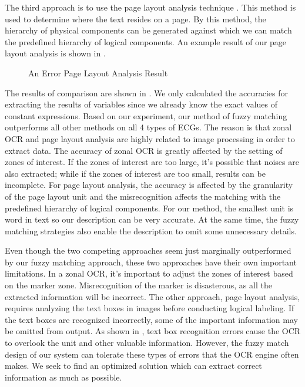 The third approach is to use the page layout analysis 
technique \cite{o1993document}. 
This method is used to determine where the text 
resides on a page. 
By this method, the hierarchy of physical components 
can be generated against which we can match the predefined 
hierarchy of logical components. An example result of our page layout 
analysis is shown in .

\begin{figure}[th]
\centering
{}
\caption{An Error Page Layout Analysis Result}
\label{fig:errorpl}
\end{figure}


The results of comparison are shown in . 
We only calculated the accuracies for extracting the results of 
variables since we already know the exact values of constant 
expressions. Based on our experiment, our method of fuzzy matching 
outperforms all other methods on all 4 types of ECGs. 
The reason is that zonal OCR and page layout analysis are highly 
related to image processing in order to extract data. The accuracy of 
zonal OCR is greatly affected by the setting of zones of interest. 
If the zones of interest are too large, it's possible that noises are
also extracted; while if the zones of interest are too small, results 
can be incomplete. For page layout analysis, the accuracy is 
affected by the granularity of the page layout unit and the 
misrecognition affects the matching with the predefined 
hierarchy of logical components. For our method, the smallest 
unit is word in text so our description can be very accurate. 
At the same time, the fuzzy matching strategies also enable 
the description to omit some unnecessary details.

Even though the two competing approaches seem just marginally outperformed
by our fuzzy matching approach, these two approaches have their own 
important limitations. 
In a zonal OCR, it's important to adjust the zones of interest 
based on the marker zone. Misrecognition of the marker 
is disasterous, as all the extracted information will be incorrect. 
The other approach, page layout analysis, requires analyzing 
the text boxes in images before conducting logical labeling. 
If the text boxes are recognized incorrectly, some of the
important information may be omitted from output. 
As shown in , 
text box recognition errors cause the OCR to overlook the unit and 
other valuable information. 
However, the fuzzy match design of our system can 
tolerate these types of errors that the OCR engine often makes. 
We seek to find an optimized solution which can extract 
correct information as much as possible. 


